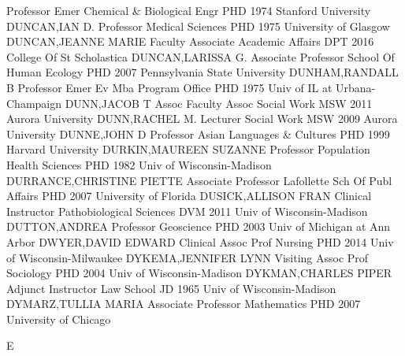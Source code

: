 \documentclass[
]{article}
\begin{document}
\textbar Professor Emer \textbar Chemical \& Biological Engr \textbar{}
 \textbar PHD 1974 Stanford University \textbar DUNCAN,IAN D.
\textbar Professor \textbar Medical Sciences \textbar{} 
\textbar PHD 1975 University of Glasgow \textbar DUNCAN,JEANNE MARIE
\textbar Faculty Associate \textbar Academic Affairs \textbar{}
 \textbar DPT 2016 College Of St Scholastica
\textbar DUNCAN,LARISSA G. \textbar Associate Professor \textbar School
Of Human Ecology \textbar{}  \textbar PHD 2007 Pennsylvania
State University \textbar DUNHAM,RANDALL B \textbar Professor Emer
\textbar Ev Mba Program Office \textbar{}  \textbar PHD 1975
Univ of IL at Urbana-Champaign \textbar DUNN,JACOB T \textbar Assoc
Faculty Assoc \textbar Social Work \textbar{}  \textbar MSW
2011 Aurora University \textbar DUNN,RACHEL M. \textbar Lecturer
\textbar Social Work \textbar{}  \textbar MSW 2009 Aurora
University \textbar DUNNE,JOHN D \textbar Professor \textbar Asian
Languages \& Cultures \textbar{}  \textbar PHD 1999 Harvard
University \textbar DURKIN,MAUREEN SUZANNE \textbar Professor
\textbar Population Health Sciences \textbar{}  \textbar PHD
1982 Univ of Wisconsin-Madison \textbar DURRANCE,CHRISTINE PIETTE
\textbar Associate Professor \textbar Lafollette Sch Of Publ Affairs
\textbar{}  \textbar PHD 2007 University of Florida
\textbar DUSICK,ALLISON FRAN \textbar Clinical Instructor
\textbar Pathobiological Sciences \textbar{}  \textbar DVM
2011 Univ of Wisconsin-Madison \textbar DUTTON,ANDREA \textbar Professor
\textbar Geoscience \textbar{}  \textbar PHD 2003 Univ of
Michigan at Ann Arbor \textbar DWYER,DAVID EDWARD \textbar Clinical
Assoc Prof \textbar Nursing \textbar{}  \textbar PHD 2014
Univ of Wisconsin-Milwaukee \textbar DYKEMA,JENNIFER LYNN
\textbar Visiting Assoc Prof \textbar Sociology \textbar{} 
\textbar PHD 2004 Univ of Wisconsin-Madison \textbar DYKMAN,CHARLES
PIPER \textbar Adjunct Instructor \textbar Law School \textbar{}
 \textbar JD 1965 Univ of Wisconsin-Madison
\textbar DYMARZ,TULLIA MARIA \textbar Associate Professor
\textbar Mathematics \textbar{}  \textbar PHD 2007 University
of Chicago \textbar{}

E

\textbar{}
\end{document}
